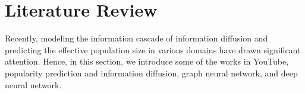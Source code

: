 
\chapter{Literature Review}
\label{chap:2}

Recently, modeling the information cascade of information diffusion and predicting the effective population size in various domains have drawn significant attention. Hence, in this section, we introduce some of the works in YouTube, popularity prediction and information diffusion, graph neural network, and deep neural network.





